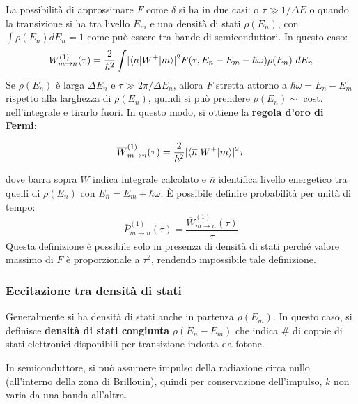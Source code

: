 \documentclass[10pt, a4paper]{scrartcl}
\numberwithin{equation}{subsection}
\theoremstyle{style1}
\theoremstyle{style2}
\newenvironment{boxenv}[1][]{
    \begin{eqbox}[#1]
    }{
   \end{eqbox}
}
\begin{document}
La possibilit\`a di approssimare $F$ come $\delta $ si ha in due casi: o $\tau \gg 1/\Delta E$ o quando la transizione si ha tra livello $E_m$ e una densit\`a di stati $\rho (E_n)$, con $\int \rho (E_n) dE_n = 1$ come pu\`o essere tra bande di semiconduttori.
In questo caso:
\[
W^{(1)} _{m\to n} (\tau ) = \frac{2}{\hbar ^2} \int \lvert \braket{n|W^+|m} \rvert  ^2 F(\tau ,E_n-E_m-\hbar \omega) \rho (E_n)\ dE_n
\] 
Se $\rho (E_n)$ \`e larga $\Delta E_n$ e $\tau  \gg 2\pi / \Delta E_{n} $, allora $F$ stretta attorno a $\hbar \omega = E_n - E_m$ rispetto alla larghezza di $\rho (E_n)$, quindi si pu\`o prendere $\rho (E_n) \sim $ cost. nell'integrale e tirarlo fuori. In questo modo, si ottiene la \textbf{regola d'oro di Fermi}:
\begin{boxenv}[]
\begin{equation}
	\overline{W}^{(1)} _{m\to n} (\tau ) = \frac{2}{\hbar ^2} \lvert \braket{\overline{n}|W^+|m}  \rvert ^2 \tau 
\end{equation}
\end{boxenv}
\noindent dove barra sopra $W$ indica integrale calcolato e $\overline{n}$ identifica livello energetico tra quelli di $\rho (E_n)$ con $E_{\overline{n}} = E_m + \hbar  \omega$. \`E possibile definire probabilit\`a per unit\`a di tempo:
\begin{equation}
	\overline{P}^{(1)} _{m\to n} (\tau ) = \frac{\overline{W}^{(1)} _{m\to n}(\tau ) }{\tau }
\end{equation}
Questa definizione \`e possibile solo in presenza di densit\`a di stati perch\'e valore massimo di $F$ \`e proporzionale a $\tau ^2$, rendendo impossibile tale definizione.
\subsubsection{Eccitazione tra densit\`a di stati}
Generalmente si ha densit\`a di stati anche in partenza $\rho (E_m)$. In questo caso, si definisce \textbf{densit\`a di stati congiunta} $\rho (E_{n} -E_m)$ che indica \# di coppie di stati elettronici disponibili per transizione indotta da fotone.

In semiconduttore, si pu\`o assumere impulso della radiazione circa nullo (all'interno della zona di Brillouin), quindi per conservazione dell'impulso, $k$ non varia da una banda all'altra.
\end{document}
